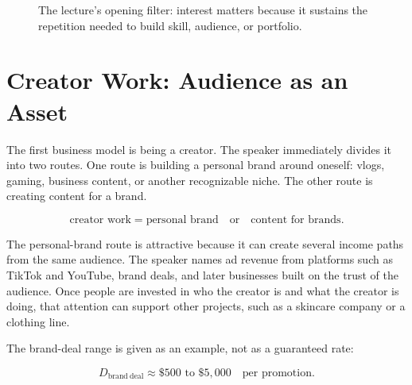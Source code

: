 \begin{figure}
\centering
{}
\caption{The lecture's opening filter: interest matters because it sustains the repetition needed to build skill, audience, or portfolio.}
\end{figure}

\section{Creator Work: Audience as an Asset}

The first business model is being a creator. The speaker immediately divides it into two routes. One route is building a personal brand around oneself: vlogs, gaming, business content, or another recognizable niche. The other route is creating content for a brand.

\begin{equation}
\text{creator work}
=
\text{personal brand}
\quad \text{or} \quad
\text{content for brands}.
\end{equation}

The personal-brand route is attractive because it can create several income paths from the same audience. The speaker names ad revenue from platforms such as TikTok and YouTube, brand deals, and later businesses built on the trust of the audience. Once people are invested in who the creator is and what the creator is doing, that attention can support other projects, such as a skincare company or a clothing line.

The brand-deal range is given as an example, not as a guaranteed rate:

\begin{equation}
D_{\mathrm{brand\ deal}}
\approx
\$500 \text{ to } \$5{,}000
\quad \text{per promotion}.
\end{equation}

